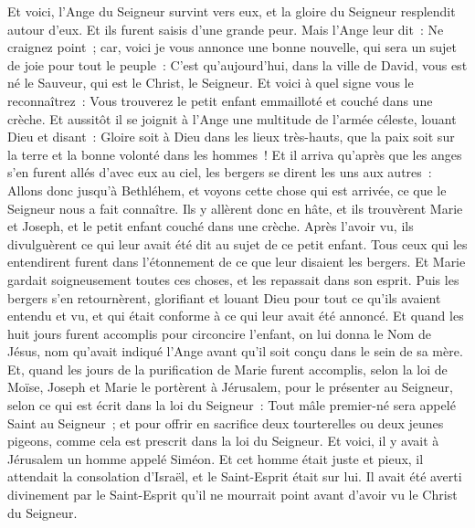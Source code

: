 \begin{multicols}{2}
Et voici, l'Ange du Seigneur survint vers eux, et la gloire du Seigneur resplendit autour d'eux. Et ils furent saisis d'une grande peur.
Mais l'Ange leur dit~: Ne craignez point~; car, voici je vous annonce une bonne nouvelle, qui sera un sujet de joie pour tout le peuple~:
C'est qu'aujourd'hui, dans la ville de David, vous est né le Sauveur, qui est le Christ, le Seigneur.
Et voici à quel signe vous le reconnaîtrez~: Vous trouverez le petit enfant emmailloté et couché dans une crèche.
Et aussitôt il se joignit à l'Ange une multitude de l'armée céleste, louant Dieu et disant~:
Gloire soit à Dieu dans les lieux très-hauts, que la paix soit sur la terre et la bonne volonté dans les hommes~!
Et il arriva qu'après que les anges s'en furent allés d'avec eux au ciel, les bergers se dirent les uns aux autres~: Allons donc jusqu'à Bethléhem, et voyons cette chose qui est arrivée, ce que le Seigneur nous a fait connaître.
Ils y allèrent donc en hâte, et ils trouvèrent Marie et Joseph, et le petit enfant couché dans une crèche.
Après l'avoir vu, ils divulguèrent ce qui leur avait été dit au sujet de ce petit enfant.
Tous ceux qui les entendirent furent dans l'étonnement de ce que leur disaient les bergers.
Et Marie gardait soigneusement toutes ces choses, et les repassait dans son esprit.
Puis les bergers s'en retournèrent, glorifiant et louant Dieu pour tout ce qu'ils avaient entendu et vu, et qui était conforme à ce qui leur avait été annoncé.
Et quand les huit jours furent accomplis pour circoncire l'enfant, on lui donna le Nom de Jésus, nom qu'avait indiqué l'Ange avant qu'il soit conçu dans le sein de sa mère.
Et, quand les jours de la purification de Marie furent accomplis, selon la loi de Moïse, Joseph et Marie le portèrent à Jérusalem, pour le présenter au Seigneur,
selon ce qui est écrit dans la loi du Seigneur~: Tout mâle premier-né sera appelé Saint au Seigneur~; 
et pour offrir en sacrifice deux tourterelles ou deux jeunes pigeons, comme cela est prescrit dans la loi du Seigneur.
Et voici, il y avait à Jérusalem un homme appelé Siméon. Et cet homme était juste et pieux, il attendait la consolation d'Israël, et le Saint-Esprit était sur lui.
Il avait été averti divinement par le Saint-Esprit qu'il ne mourrait point avant d'avoir vu le Christ du Seigneur.

\end{multicols}
